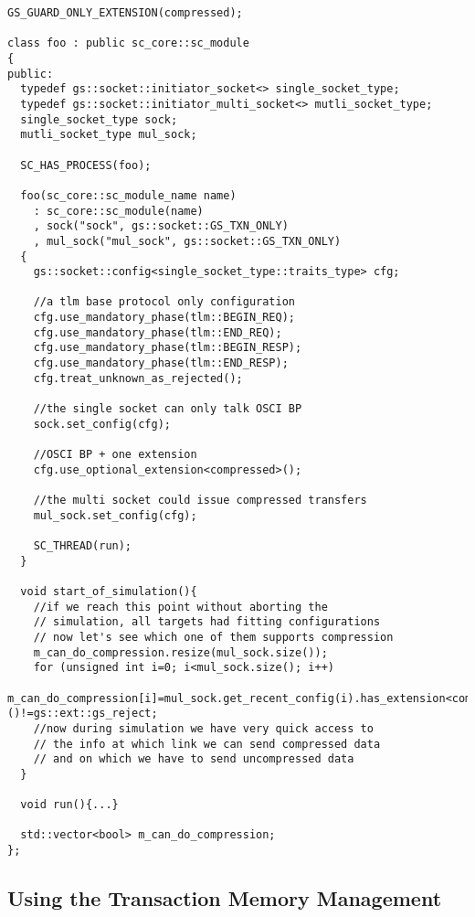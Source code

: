 \documentclass[a4paper,10pt]{article}          %
\begin{document}
\begin{small}
\begin{verbatim}
GS_GUARD_ONLY_EXTENSION(compressed);

class foo : public sc_core::sc_module
{
public:
  typedef gs::socket::initiator_socket<> single_socket_type;
  typedef gs::socket::initiator_multi_socket<> mutli_socket_type;
  single_socket_type sock;
  mutli_socket_type mul_sock;
  
  SC_HAS_PROCESS(foo);

  foo(sc_core::sc_module_name name)
    : sc_core::sc_module(name)
    , sock("sock", gs::socket::GS_TXN_ONLY)
    , mul_sock("mul_sock", gs::socket::GS_TXN_ONLY)
  {
    gs::socket::config<single_socket_type::traits_type> cfg;
    
    //a tlm base protocol only configuration
    cfg.use_mandatory_phase(tlm::BEGIN_REQ);
    cfg.use_mandatory_phase(tlm::END_REQ);
    cfg.use_mandatory_phase(tlm::BEGIN_RESP);
    cfg.use_mandatory_phase(tlm::END_RESP);
    cfg.treat_unknown_as_rejected();
  
    //the single socket can only talk OSCI BP
    sock.set_config(cfg);
    
    //OSCI BP + one extension
    cfg.use_optional_extension<compressed>();
  
    //the multi socket could issue compressed transfers
    mul_sock.set_config(cfg);
  
    SC_THREAD(run);
  }
  
  void start_of_simulation(){
    //if we reach this point without aborting the
    // simulation, all targets had fitting configurations
    // now let's see which one of them supports compression
    m_can_do_compression.resize(mul_sock.size());
    for (unsigned int i=0; i<mul_sock.size(); i++)
      m_can_do_compression[i]=mul_sock.get_recent_config(i).has_extension<compressed>()!=gs::ext::gs_reject;
    //now during simulation we have very quick access to
    // the info at which link we can send compressed data
    // and on which we have to send uncompressed data
  }
  
  void run(){...}

  std::vector<bool> m_can_do_compression;
};
\end{verbatim}
\end{small}

\subsection{Using the Transaction Memory Management}
\end{document}
